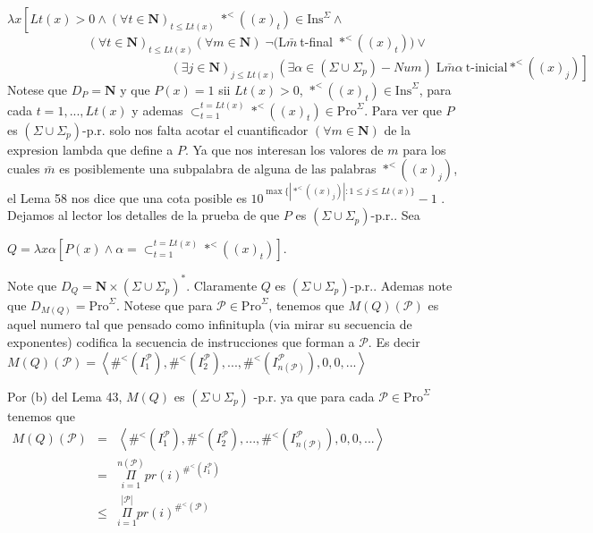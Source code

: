 \(\lambda x\left[ Lt(x) >0\wedge (\forall t\in \mathbf{N})_{t\leq Lt(x)}\;\ast ^{< }((x)_{t})\in \mathrm{Ins}^{\Sigma }\wedge \right. \)
\(\ \ \ \ \ \ \ \ \ \ \ \ \ \ \ \ \ \ \ \ \ \ \ \ \ \ \ \ \ (\forall t\in \mathbf{N})_{t\leq Lt(x)}(\forall m\in \mathbf{N})\;\lnot (\mathrm{L} \bar{m}\ \)t-final \(\ast ^{< }((x)_{t}))\vee \)
\(\ \ \ \ \ \ \ \ \ \ \ \ \ \ \ \ \ \ \ \ \ \ \ \ \ \ \ \ \ \ \ \ \ \ \ \ \ \ \ \ \ \ \ \ \ \ \ \ \ \ \ \ \ \ \ \ \ \ \ \left. (\exists j\in \mathbf{ N})_{j\leq Lt(x)}(\exists \alpha \in (\Sigma \cup \Sigma _{p})-Num)\;\mathrm{ L}\bar{m}\alpha \ \text{t-inicial}\ast ^{< }((x)_{j})\right] \)
Notese que \(D_{P}=\mathbf{N}\) y que \(P(x)=1\) sii \(Lt(x) >0\), \(\ast ^{< }((x)_{t})\in \mathrm{Ins}^{\Sigma }\), para cada \(t=1,...,Lt(x)\) y ademas \(\subset _{t=1}^{t=Lt(x)}\ast ^{< }((x)_{t})\in \mathrm{Pro}^{\Sigma }\). Para ver que \(P\) es \((\Sigma \cup \Sigma _{p})\)-p.r. solo nos falta acotar el cuantificador \((\forall m\in \mathbf{N})\) de la expresion lambda que define a \(P\). Ya que nos interesan los valores de \(m\) para los cuales \(\bar{m}\) es posiblemente una subpalabra de alguna de las palabras \(\ast ^{< }((x)_{j})\), el Lema 58 nos dice que una cota posible es \( 10^{\max \{\left\vert \ast ^{< }((x)_{j})\right\vert :1\leq j\leq Lt(x)\}}-1\) . Dejamos al lector los detalles de la prueba de que \(P\) es \((\Sigma \cup \Sigma _{p})\)-p.r.. Sea

\(\displaystyle Q=\lambda x\alpha \left[ P(x)\wedge \alpha =\subset _{t=1}^{t=Lt(x)}\ast ^{< }((x)_{t})\right] \text{.} \)

Note que \(D_{Q}=\mathbf{N}\times (\Sigma \cup \Sigma _{p})^{\ast }\). Claramente \(Q\) es \((\Sigma \cup \Sigma _{p})\)-p.r.. Ademas note que \( D_{M(Q)}=\mathrm{Pro}^{\Sigma }\). Notese que para \(\mathcal{P}\in \mathrm{Pro }^{\Sigma }\), tenemos que \(M(Q)(\mathcal{P})\) es aquel numero tal que pensado como infinitupla (via mirar su secuencia de exponentes) codifica la secuencia de instrucciones que forman a \(\mathcal{P}\). Es decir
\(\displaystyle M(Q)(\mathcal{P})=\left\langle \#^{< }(I_{1}^{\mathcal{P}}),\#^{< }(I_{2}^{ \mathcal{P}}),...,\#^{< }(I_{n(\mathcal{P})}^{\mathcal{P}}),0,0,...\right \rangle \)

Por (b) del Lema 43, \(M(Q)\) es \((\Sigma \cup \Sigma _{p})\) -p.r. ya que para cada \(\mathcal{P}\in \mathrm{Pro}^{\Sigma }\) tenemos que
\(\displaystyle \begin{array}{rcl} M(Q)(\mathcal{P}) & =& \left\langle \#^{< }(I_{1}^{\mathcal{P}}),\#^{< }(I_{2}^{ \mathcal{P}}),...,\#^{< }(I_{n(\mathcal{P})}^{\mathcal{P}}),0,0,...\right \rangle \\ & =& \underset{i=1}{\overset{n(\mathcal{P})}{\Pi }}pr(i)^{\#^{< }(I_{1}^{ \mathcal{P}})} \\ & \leq & \underset{i=1}{\overset{\left\vert \mathcal{P}\right\vert }{\Pi }} pr(i)^{\#^{< }(\mathcal{P})} \end{array} \)

